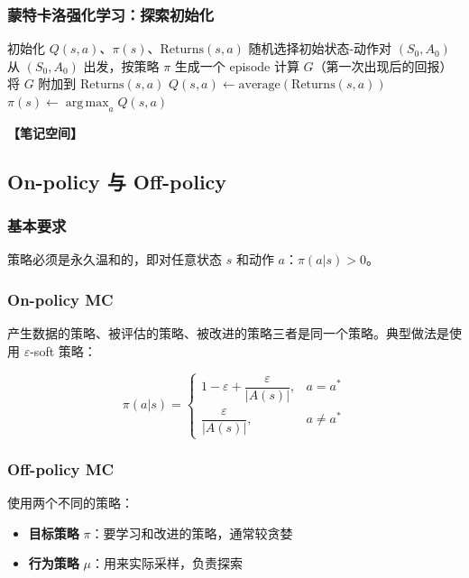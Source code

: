 \documentclass[12pt,a4paper]{article}
\newcommand{\notespace}[1][3cm]{%
  \vspace{#1}%
  \noindent\textbf{【笔记空间】}%
  \vspace{#1}%
}
\newcommand{\1}{\mathbf{1}}
\newcommand{\argmax}{\operatorname*{arg\,max}}
\begin{document}
\subsubsection*{蒙特卡洛强化学习：探索初始化}

\begin{algorithmic}[1]
\State 初始化 $Q(s,a)$、$\pi(s)$、$\mathrm{Returns}(s,a)$
\Repeat
  \State 随机选择初始状态-动作对 $(S_0,A_0)$
  \State 从 $(S_0,A_0)$ 出发，按策略 $\pi$ 生成一个 episode
    \State 计算 $G$（第一次出现后的回报）
    \State 将 $G$ 附加到 $\mathrm{Returns}(s,a)$
    \State $Q(s,a)\leftarrow \mathrm{average}(\mathrm{Returns}(s,a))$
  \EndFor
  \State $\pi(s)\leftarrow \argmax_a Q(s,a)$
\end{algorithmic}

\notespace[2cm]

\subsection{On-policy 与 Off-policy}

\subsubsection*{基本要求}

策略必须是永久温和的，即对任意状态 $s$ 和动作 $a$：$\pi(a|s)>0$。

\subsubsection*{On-policy MC}

产生数据的策略、被评估的策略、被改进的策略三者是同一个策略。典型做法是使用 $\varepsilon$-soft 策略：

\begin{equation}
\pi(a|s)= \begin{cases} 1-\varepsilon+\dfrac{\varepsilon}{|A(s)|}, & a=a^* \\ \dfrac{\varepsilon}{|A(s)|}, & a\neq a^* \end{cases}
\end{equation}

\subsubsection*{Off-policy MC}

使用两个不同的策略：

\begin{itemize}[leftmargin=2em]
  \item \textbf{目标策略} $\pi$：要学习和改进的策略，通常较贪婪
  \item \textbf{行为策略} $\mu$：用来实际采样，负责探索
\end{itemize}
\end{document}
